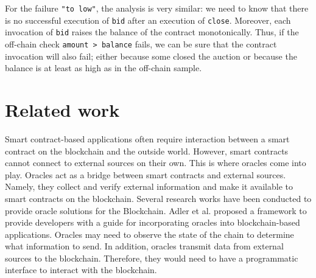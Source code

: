 \documentclass[a4paper,USenglish,american,cleveref, autoref, thm-restate]{oasics-v2021}
\begin{document}
For the failure \lstinline/"to low"/, the analysis is very similar:
we need to know that there is no successful execution of
\lstinline/bid/ after an execution of \lstinline/close/. Moreover,
each invocation of \lstinline/bid/ raises the balance of the contract
monotonically. Thus, if the off-chain check
\lstinline/amount > balance/ fails, we can be sure that the contract
invocation will also fail; either because some closed the auction or
because the balance is at least as high as in the off-chain sample. 
\section{Related work}
\label{sec:related-work}



Smart contract-based applications often require interaction between a smart contract on the blockchain and the outside world. However, smart contracts cannot connect to external sources on their own. This is where oracles \cite{oracle-patterns,call-action-oracle} come into play. Oracles act as a bridge between smart contracts and external sources. Namely, they collect and verify external information and make it available to smart contracts on the blockchain. Several research works have been conducted to provide oracle solutions for the Blockchain. Adler et al.\cite{blockchain-oracles} proposed a framework to provide developers with a guide for incorporating oracles into blockchain-based applications. Oracles may need to observe the state of the chain to determine what information to send. In addition, oracles transmit data from external sources to the blockchain. Therefore, they would need to have a programmatic interface to interact with the blockchain. %
\end{document}
